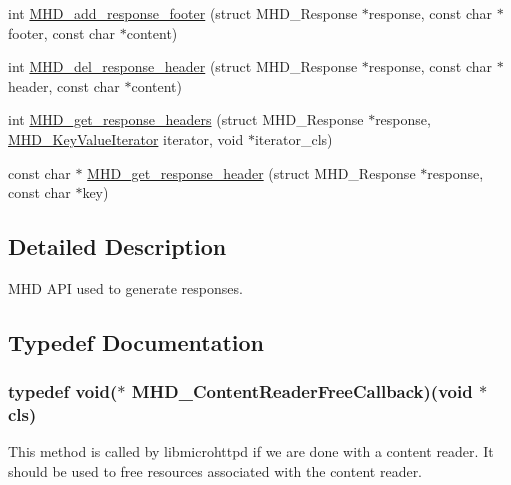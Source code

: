 \begin{DoxyCompactItemize}
\item 
int \hyperlink{group__response_ga1d26df6af7378755cdf85e290736b0ec}{\-M\-H\-D\-\_\-add\-\_\-response\-\_\-footer} (struct \-M\-H\-D\-\_\-\-Response $\ast$response, const char $\ast$footer, const char $\ast$content)
\item 
int \hyperlink{group__response_gabb2405455f580377e4887611f81b7638}{\-M\-H\-D\-\_\-del\-\_\-response\-\_\-header} (struct \-M\-H\-D\-\_\-\-Response $\ast$response, const char $\ast$header, const char $\ast$content)
\item 
int \hyperlink{group__response_ga3e182fe6161e314b83fd9a910b2d9072}{\-M\-H\-D\-\_\-get\-\_\-response\-\_\-headers} (struct \-M\-H\-D\-\_\-\-Response $\ast$response, \hyperlink{group__request_ga4a3cbf233bf4c7ffabeb3e85490ff464}{\-M\-H\-D\-\_\-\-Key\-Value\-Iterator} iterator, void $\ast$iterator\-\_\-cls)
\item 
const char $\ast$ \hyperlink{group__response_gade6bba8c8709dd9892d5125cdbb1588b}{\-M\-H\-D\-\_\-get\-\_\-response\-\_\-header} (struct \-M\-H\-D\-\_\-\-Response $\ast$response, const char $\ast$key)
\end{DoxyCompactItemize}


\subsection{\-Detailed \-Description}
\-M\-H\-D \-A\-P\-I used to generate responses. 

\subsection{\-Typedef \-Documentation}
\hypertarget{group__response_gae678e9aeb43b374f595d082737b68272}{
\subsubsection[{\-M\-H\-D\-\_\-\-Content\-Reader\-Free\-Callback}]{\setlength{\rightskip}{0pt plus 5cm}typedef void($\ast$ {\bf \-M\-H\-D\-\_\-\-Content\-Reader\-Free\-Callback})(void $\ast$cls)}}\label{group__response_gae678e9aeb43b374f595d082737b68272}
\-This method is called by libmicrohttpd if we are done with a content reader. \-It should be used to free resources associated with the content reader.


